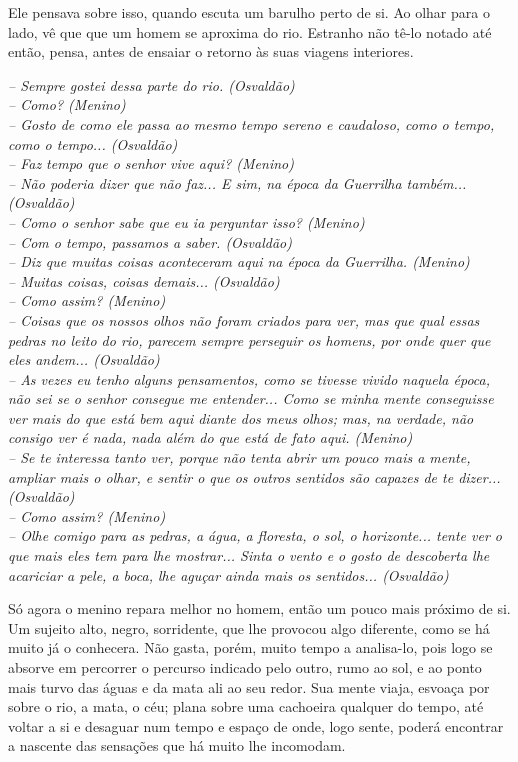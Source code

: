 Ele pensava sobre isso, quando escuta um barulho perto de si. Ao olhar para o lado, vê que que um homem se aproxima do rio. Estranho não tê-lo notado até então, pensa, antes de ensaiar o retorno às suas viagens interiores.

\noindent
\textit{-- Sempre gostei dessa parte do rio. (Osvaldão)\\
-- Como? (Menino)\\
-- Gosto de como ele passa ao mesmo tempo sereno e caudaloso, como o tempo, como o tempo... (Osvaldão)\\
-- Faz tempo que o senhor vive aqui? (Menino)\\
-- Não poderia dizer que não faz... E sim, na época da Guerrilha também... (Osvaldão)\\
-- Como o senhor sabe que eu ia perguntar isso? (Menino)\\
-- Com o tempo, passamos a saber. (Osvaldão)\\
-- Diz que muitas coisas aconteceram aqui na época da Guerrilha. (Menino)\\
-- Muitas coisas, coisas demais... (Osvaldão)\\
-- Como assim? (Menino)\\
-- Coisas que os nossos olhos não foram criados para ver, mas que qual essas pedras no leito do rio, parecem sempre perseguir os homens, por onde quer que eles andem... (Osvaldão)\\
-- As vezes eu tenho alguns pensamentos, como se tivesse vivido naquela época, não sei se o senhor consegue me entender... Como se minha mente conseguisse ver mais do que está bem aqui diante dos meus olhos; mas, na verdade, não consigo ver é nada, nada além do que está de fato aqui. (Menino)\\
-- Se te interessa tanto ver, porque não tenta abrir um pouco mais a mente, ampliar mais o olhar, e sentir o que os outros sentidos são capazes de te dizer... (Osvaldão)\\
-- Como assim? (Menino)\\
-- Olhe comigo para as pedras, a água, a floresta, o sol, o horizonte... tente ver o que mais eles tem para lhe mostrar... Sinta o vento e o gosto de descoberta lhe acariciar a pele, a boca, lhe aguçar ainda mais os sentidos... (Osvaldão)}

Só agora o menino repara melhor no homem, então um pouco mais próximo de si. Um sujeito alto, negro, sorridente, que lhe provocou algo diferente, como se há muito já o conhecera. Não gasta, porém, muito tempo a analisa-lo, pois logo se absorve em percorrer o percurso indicado pelo outro, rumo ao sol, e ao ponto mais turvo das águas e da mata ali ao seu redor. Sua mente viaja, esvoaça por sobre o rio, a mata, o céu; plana sobre uma cachoeira qualquer do tempo, até voltar a si e desaguar num tempo e espaço de onde, logo sente, poderá encontrar a nascente das sensações que há muito lhe incomodam.

